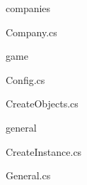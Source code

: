 \begin{minipage}[t]{0.4\textwidth}
\begin{footnotesize}

\phantom{newline}

\phantom{newline}


		
		\begin{description}
						
			
			\item \faFolderOpenO\ companies
			\begin{description}
				\item \faFileCodeO\ Company.cs
			\end{description}
			
			\item \faFolderOpenO\ game
			\begin{description}
				\item \faFileCodeO\ Config.cs
				\item \faFileCodeO\ CreateObjects.cs			
			\end{description}
			
			\item \faFolderOpenO\ general
			\begin{description}
				\item \faFileCodeO\ CreateInstance.cs
				\item \faFileCodeO\ General.cs			
			\end{description}
			

\end{description}
\end{footnotesize}
\end{minipage}
